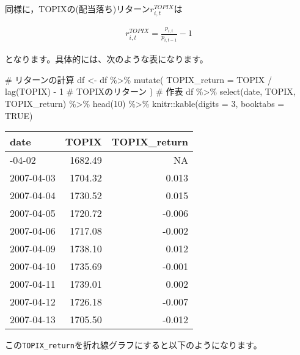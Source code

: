 \documentclass[
  letterpaper,
  pandoc,
  ja=standard,
  jafont = hiragino-pron]{ltjsbook}
\newenvironment{Shaded}{\begin{snugshade}}{\end{snugshade}}
\newcommand{\AttributeTok}[1]{\textcolor[rgb]{0.40,0.45,0.13}{#1}}
\newcommand{\CommentTok}[1]{\textcolor[rgb]{0.37,0.37,0.37}{#1}}
\newcommand{\ConstantTok}[1]{\textcolor[rgb]{0.56,0.35,0.01}{#1}}
\newcommand{\DecValTok}[1]{\textcolor[rgb]{0.68,0.00,0.00}{#1}}
\newcommand{\FunctionTok}[1]{\textcolor[rgb]{0.28,0.35,0.67}{#1}}
\newcommand{\NormalTok}[1]{\textcolor[rgb]{0.00,0.23,0.31}{#1}}
\newcommand{\OtherTok}[1]{\textcolor[rgb]{0.00,0.23,0.31}{#1}}
\newcommand{\SpecialCharTok}[1]{\textcolor[rgb]{0.37,0.37,0.37}{#1}}
\begin{document}
同様に，TOPIXの(配当落ち)リターン\(r^{TOPIX}_{i,t}\)は

\[
\begin{aligned}
r^{TOPIX}_{i,t} = \frac{p_{i,t}}{p_{i,t-1}} - 1
\end{aligned}
\]

となります。具体的には、次のような表になります。

\begin{Shaded}
\begin{Highlighting}[]
\CommentTok{\# リターンの計算}
\NormalTok{df }\OtherTok{\textless{}{-}}\NormalTok{ df }\SpecialCharTok{\%\textgreater{}\%}
  \FunctionTok{mutate}\NormalTok{(}
      \AttributeTok{TOPIX\_return =}\NormalTok{ TOPIX }\SpecialCharTok{/} \FunctionTok{lag}\NormalTok{(TOPIX) }\SpecialCharTok{{-}} \DecValTok{1} \CommentTok{\# TOPIXのリターン}
\NormalTok{      )}
\CommentTok{\# 作表}
\NormalTok{df }\SpecialCharTok{\%\textgreater{}\%}
  \FunctionTok{select}\NormalTok{(date, TOPIX, TOPIX\_return) }\SpecialCharTok{\%\textgreater{}\%}
  \FunctionTok{head}\NormalTok{(}\DecValTok{10}\NormalTok{) }\SpecialCharTok{\%\textgreater{}\%}
\NormalTok{  knitr}\SpecialCharTok{::}\FunctionTok{kable}\NormalTok{(}\AttributeTok{digits =} \DecValTok{3}\NormalTok{, }\AttributeTok{booktabs =} \ConstantTok{TRUE}\NormalTok{)}
\end{Highlighting}
\end{Shaded}

\begin{longtable}[]{@{}lrr@{}}
\toprule\noalign{}
date & TOPIX & TOPIX\_return \\
\midrule\noalign{}
\endhead
\bottomrule\noalign{}
\endlastfoot
2007-04-02 & 1682.49 & NA \\
2007-04-03 & 1704.32 & 0.013 \\
2007-04-04 & 1730.52 & 0.015 \\
2007-04-05 & 1720.72 & -0.006 \\
2007-04-06 & 1717.08 & -0.002 \\
2007-04-09 & 1738.10 & 0.012 \\
2007-04-10 & 1735.69 & -0.001 \\
2007-04-11 & 1739.01 & 0.002 \\
2007-04-12 & 1726.18 & -0.007 \\
2007-04-13 & 1705.50 & -0.012 \\
\end{longtable}

この\texttt{TOPIX\_return}を折れ線グラフにすると以下のようになります。
\end{document}
